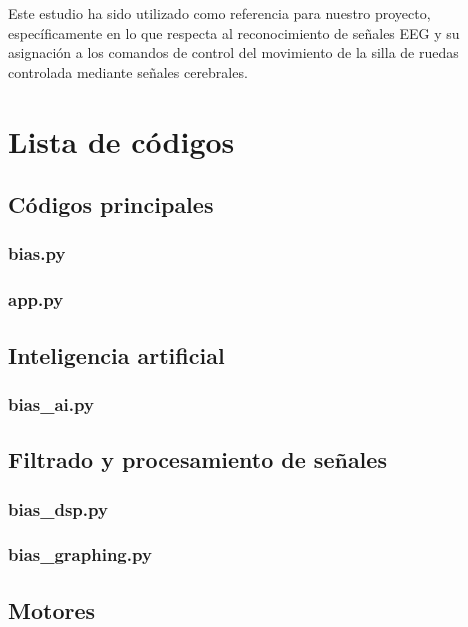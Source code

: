 \documentclass{article}
\begin{document}
Este estudio ha sido utilizado como referencia para nuestro proyecto, específicamente en lo que respecta al reconocimiento de señales EEG y su asignación a los comandos de control del movimiento de la silla de ruedas controlada mediante señales cerebrales.



\section{Lista de códigos}

\subsection{Códigos principales}

\subsubsection{bias.py}


\subsubsection{app.py}

\subsection{Inteligencia artificial}

\subsubsection{bias\_ai.py}

\subsection{Filtrado y procesamiento de señales}

\subsubsection{bias\_dsp.py}

\subsubsection{bias\_graphing.py} 


\subsection{Motores}
\end{document}
